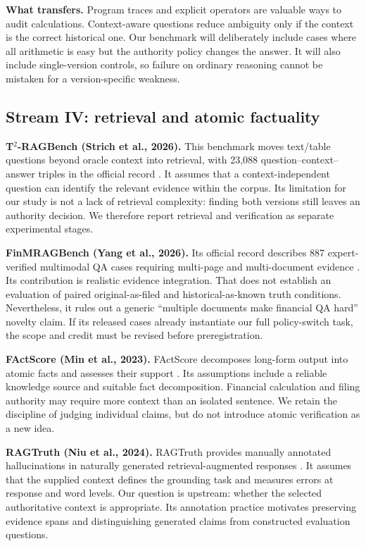 \documentclass[11pt,a4paper]{article}
\newcommand{\pbreak}{\clearpage}
\newcommand{\lead}[1]{\textbf{\color{navy}#1}}
\begin{document}
\lead{What transfers.} Program traces and explicit operators are valuable ways to audit calculations. Context-aware questions reduce ambiguity only if the context is the correct historical one. Our benchmark will deliberately include cases where all arithmetic is easy but the authority policy changes the answer. It will also include single-version controls, so failure on ordinary reasoning cannot be mistaken for a version-specific weakness.

\pbreak
\subsection{Stream IV: retrieval and atomic factuality}
\lead{T\(^{2}\)-RAGBench (Strich et al., 2026).} This benchmark moves text/table questions beyond oracle context into retrieval, with 23,088 question--context--answer triples in the official record \cite{t2ragbench}. It assumes that a context-independent question can identify the relevant evidence within the corpus. Its limitation for our study is not a lack of retrieval complexity: finding both versions still leaves an authority decision. We therefore report retrieval and verification as separate experimental stages.

\lead{FinMRAGBench (Yang et al., 2026).} Its official record describes 887 expert-verified multimodal QA cases requiring multi-page and multi-document evidence \cite{finmragbench}. Its contribution is realistic evidence integration. That does not establish an evaluation of paired original-as-filed and historical-as-known truth conditions. Nevertheless, it rules out a generic “multiple documents make financial QA hard” novelty claim. If its released cases already instantiate our full policy-switch task, the scope and credit must be revised before preregistration.

\lead{FActScore (Min et al., 2023).} FActScore decomposes long-form output into atomic facts and assesses their support \cite{factscore}. Its assumptions include a reliable knowledge source and suitable fact decomposition. Financial calculation and filing authority may require more context than an isolated sentence. We retain the discipline of judging individual claims, but do not introduce atomic verification as a new idea.

\lead{RAGTruth (Niu et al., 2024).} RAGTruth provides manually annotated hallucinations in naturally generated retrieval-augmented responses \cite{ragtruth}. It assumes that the supplied context defines the grounding task and measures errors at response and word levels. Our question is upstream: whether the selected authoritative context is appropriate. Its annotation practice motivates preserving evidence spans and distinguishing generated claims from constructed evaluation questions.
\end{document}
